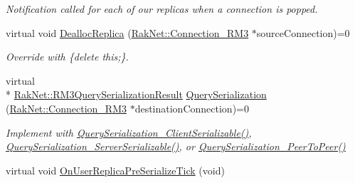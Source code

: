 \begin{DoxyCompactItemize}
\begin{DoxyCompactList}\small\item\em Notification called for each of our replicas when a connection is popped. \end{DoxyCompactList}\item 
virtual void \hyperlink{class_rak_net_1_1_replica3_acf667862eb0f6ff14ce29c4a7146ccab}{Dealloc\-Replica} (\hyperlink{class_rak_net_1_1_connection___r_m3}{Rak\-Net\-::\-Connection\-\_\-\-R\-M3} $\ast$source\-Connection)=0
\begin{DoxyCompactList}\small\item\em Override with \{delete this;\}. \end{DoxyCompactList}\item 
virtual \\*
\hyperlink{group___r_e_p_l_i_c_a___m_a_n_a_g_e_r___g_r_o_u_p3_ga9a29b413d7f2b9cb21c16457631d3aef}{Rak\-Net\-::\-R\-M3\-Query\-Serialization\-Result} \hyperlink{class_rak_net_1_1_replica3_abc1b2daa5c1a908ddd2d6df44da7e9aa}{Query\-Serialization} (\hyperlink{class_rak_net_1_1_connection___r_m3}{Rak\-Net\-::\-Connection\-\_\-\-R\-M3} $\ast$destination\-Connection)=0
\begin{DoxyCompactList}\small\item\em Implement with \hyperlink{class_rak_net_1_1_replica3_a8af3a3d3cee9098378deea019710852c}{Query\-Serialization\-\_\-\-Client\-Serializable()}, \hyperlink{class_rak_net_1_1_replica3_a2a2c5faec10124231298d43e6f628234}{Query\-Serialization\-\_\-\-Server\-Serializable()}, or \hyperlink{class_rak_net_1_1_replica3_a212c9fff207005acf494fb9c4ae9e194}{Query\-Serialization\-\_\-\-Peer\-To\-Peer()} \end{DoxyCompactList}\item 
\hypertarget{class_rak_net_1_1_replica3_a1f633cb586ee48c3f3026f1af1053ba6}{virtual void \hyperlink{class_rak_net_1_1_replica3_a1f633cb586ee48c3f3026f1af1053ba6}{On\-User\-Replica\-Pre\-Serialize\-Tick} (void)}\label{class_rak_net_1_1_replica3_a1f633cb586ee48c3f3026f1af1053ba6}


\end{DoxyCompactItemize}
